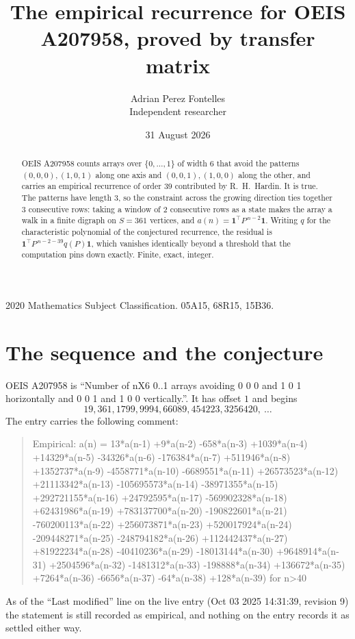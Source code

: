 \documentclass[11pt,a4paper]{article}
\title{The empirical recurrence for OEIS A207958, proved by transfer matrix}
\author{Adrian Perez Fontelles\\ \small Independent researcher}
\date{31 August 2026}
\theoremstyle{plain}
\theoremstyle{definition}
\begin{document}
\maketitle

\begin{abstract}
OEIS A207958 counts arrays over $\{0,\dots,1\}$ of width $6$ that avoid the patterns
$(0,0,0), (1,0,1)$ along one axis and $(0,0,1), (1,0,0)$ along the other, and carries an empirical recurrence of
order $39$ contributed by R.~H.~Hardin. It is true. The patterns have length $3$, so
the constraint across the growing direction ties together $3$ consecutive rows: taking a
window of $2$ consecutive rows as a state makes the array a walk in a finite digraph
on $S=361$ vertices, and $a(n)=\mathbf{1}^{\!\top}P^{\,n-2}\mathbf{1}$. Writing $q$
for the characteristic polynomial of the conjectured recurrence, the residual is
$\mathbf{1}^{\!\top}P^{\,n-2-39}q(P)\mathbf{1}$, which vanishes identically
beyond a threshold that the computation pins down exactly. Finite, exact, integer.
\end{abstract}

\noindent\small 2020 Mathematics Subject Classification. 05A15, 68R15, 15B36.\normalsize

\section{The sequence and the conjecture}

OEIS A207958 is ``Number of nX6 0..1 arrays avoiding 0 0 0 and 1 0 1 horizontally and 0 0 1 and 1 0 0 vertically.''. It has offset
$1$ and begins
\[
19, 361, 1799, 9994, 66089, 454223, 3256420,\ \dots
\]
The entry carries the following comment:
\begin{quote}\small
Empirical: a(n) = 13*a(n-1) +9*a(n-2) -658*a(n-3) +1039*a(n-4) +14329*a(n-5) -34326*a(n-6) -176384*a(n-7) +511946*a(n-8) +1352737*a(n-9) -4558771*a(n-10) -6689551*a(n-11) +26573523*a(n-12) +21113342*a(n-13) -105695573*a(n-14) -38971355*a(n-15) +292721155*a(n-16) +24792595*a(n-17) -569902328*a(n-18) +62431986*a(n-19) +783137700*a(n-20) -190822601*a(n-21) -760200113*a(n-22) +256073871*a(n-23) +520017924*a(n-24) -209448271*a(n-25) -248794182*a(n-26) +112442437*a(n-27) +81922234*a(n-28) -40410236*a(n-29) -18013144*a(n-30) +9648914*a(n-31) +2504596*a(n-32) -1481312*a(n-33) -198888*a(n-34) +136672*a(n-35) +7264*a(n-36) -6656*a(n-37) -64*a(n-38) +128*a(n-39) for n>40
\end{quote}
As of the ``Last modified'' line on the live entry (Oct 03 2025 14:31:39, revision
9) the statement is still recorded as empirical, and nothing on the entry
records it as settled either way.
\end{document}
